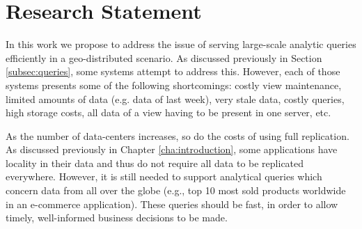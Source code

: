 
%

\chapter{Research Statement}
\label{cha:research_statement}



In this work we propose to address the issue of serving large-scale analytic queries efficiently in a geo-distributed scenario.
As discussed previously in Section \ref{subsec:queries}, some systems attempt to address this.
However, each of those systems presents some of the following shortcomings: costly view maintenance, limited amounts of data (e.g. data of last week), very stale data, costly queries, high storage costs, all data of a view having to be present in one server, etc.

As the number of data-centers increases, so do the costs of using full replication.
As discussed previously in Chapter \ref{cha:introduction}, some applications have locality in their data and thus do not require all data to be replicated everywhere.
However, it is still needed to support analytical queries which concern data from all over the globe (e.g., top 10 most sold products worldwide in an e-commerce application).
These queries should be fast, in order to allow timely, well-informed business decisions to be made.


